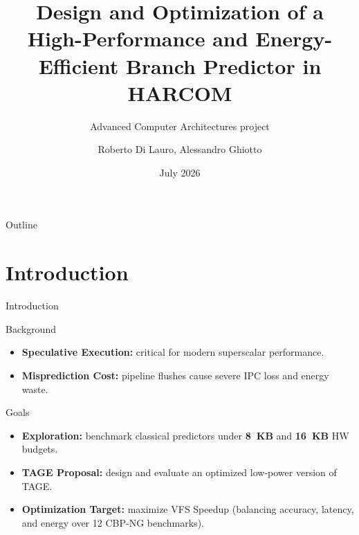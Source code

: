 \documentclass[aspectratio=169]{beamer}
\title[Branch Prediction]{Design and Optimization of a High-Performance and Energy-Efficient Branch Predictor in HARCOM}
\subtitle{Advanced Computer Architectures project}
\author[Di Lauro, Ghiotto]{Roberto Di Lauro, Alessandro Ghiotto}
\institute[PoliMi]{Politecnico di Milano - MSc HPC Engineering}
\date{July 2026}
\begin{document}
\begin{frame}
    \titlepage
\end{frame}

\begin{frame}{Outline}
    \tableofcontents
\end{frame}

\section{Introduction}
\begin{frame}{Introduction}
    \begin{block}{Background}
        \begin{itemize}
            \item \textbf{Speculative Execution:} critical for modern superscalar performance.
            \item \textbf{Misprediction Cost:} pipeline flushes cause severe IPC loss and energy waste.
        \end{itemize}
    \end{block}
    \begin{block}{Goals}
        \begin{itemize}
            \item \textbf{Exploration:} benchmark classical predictors under \textbf{8~KB} and \textbf{16~KB} HW budgets.
            \item \textbf{TAGE Proposal:} design and evaluate an optimized low-power version of TAGE.
            \item \textbf{Optimization Target:} maximize VFS Speedup (balancing accuracy, latency, and energy over 12 CBP-NG benchmarks).
        \end{itemize}
    \end{block}
\end{frame}
\end{document}

